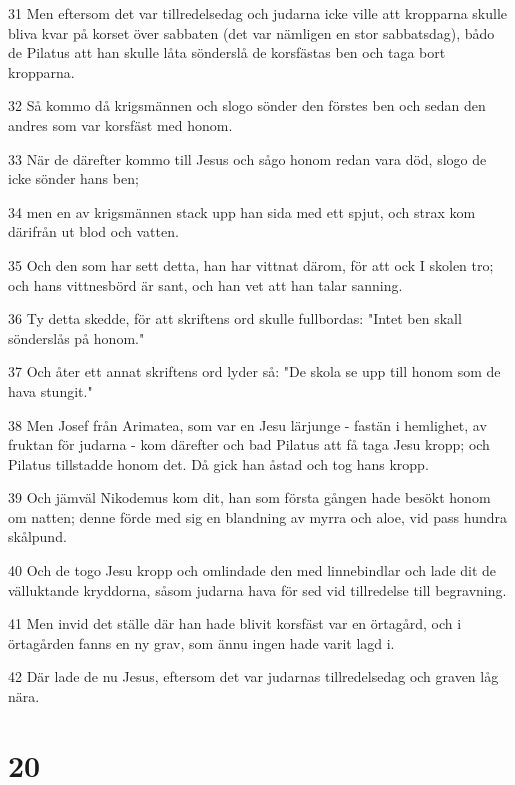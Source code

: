 \par 31 Men eftersom det var tillredelsedag och judarna icke ville att kropparna skulle bliva kvar på korset över sabbaten (det var nämligen en stor sabbatsdag), bådo de Pilatus att han skulle låta sönderslå de korsfästas ben och taga bort kropparna.
\par 32 Så kommo då krigsmännen och slogo sönder den förstes ben och sedan den andres som var korsfäst med honom.
\par 33 När de därefter kommo till Jesus och sågo honom redan vara död, slogo de icke sönder hans ben;
\par 34 men en av krigsmännen stack upp han sida med ett spjut, och strax kom därifrån ut blod och vatten.
\par 35 Och den som har sett detta, han har vittnat därom, för att ock I skolen tro; och hans vittnesbörd är sant, och han vet att han talar sanning.
\par 36 Ty detta skedde, för att skriftens ord skulle fullbordas: "Intet ben skall sönderslås på honom."
\par 37 Och åter ett annat skriftens ord lyder så: "De skola se upp till honom som de hava stungit."
\par 38 Men Josef från Arimatea, som var en Jesu lärjunge - fastän i hemlighet, av fruktan för judarna - kom därefter och bad Pilatus att få taga Jesu kropp; och Pilatus tillstadde honom det. Då gick han åstad och tog hans kropp.
\par 39 Och jämväl Nikodemus kom dit, han som första gången hade besökt honom om natten; denne förde med sig en blandning av myrra och aloe, vid pass hundra skålpund.
\par 40 Och de togo Jesu kropp och omlindade den med linnebindlar och lade dit de välluktande kryddorna, såsom judarna hava för sed vid tillredelse till begravning.
\par 41 Men invid det ställe där han hade blivit korsfäst var en örtagård, och i örtagården fanns en ny grav, som ännu ingen hade varit lagd i.
\par 42 Där lade de nu Jesus, eftersom det var judarnas tillredelsedag och graven låg nära.

\chapter{20}

